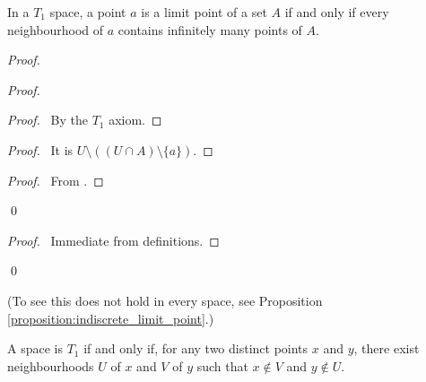 \begin{theorem}
    \label{theorem:limit_point_T1}
    In a $T_1$ space, a point $a$ is a limit point of a set $A$ if and only if every neighbourhood of $a$
    contains infinitely many points of $A$.
\end{theorem}

\begin{proof}
    \pf
    \begin{proof}
        \begin{proof}
            \pf\ By the $T_1$ axiom.
        \end{proof}
        \begin{proof}
            \pf\ It is $U \setminus ((U \cap A) \setminus \{a\})$.
        \end{proof}
        \begin{proof}
            \pf\ From .
        \end{proof}
        \qedstep
        \qed
    \end{proof}
    \begin{proof}
        \pf\ Immediate from definitions.
    \end{proof}
    \qed
\end{proof}

(To see this does not hold in every space, see Proposition \ref{proposition:indiscrete_limit_point}.)

\begin{proposition}
    A space is $T_1$ if and only if, for any two distinct points $x$ and $y$, there exist neighbourhoods
    $U$ of $x$ and $V$ of $y$ such that $x \notin V$ and $y \notin U$.
\end{proposition}

